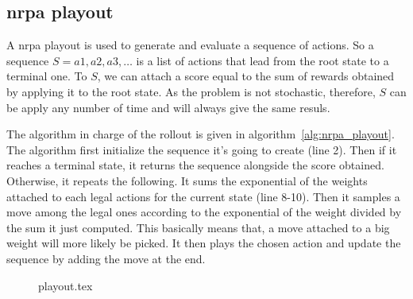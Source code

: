 \subsection{\acrshort{nrpa} playout}%
\label{sub:nrpa_playout}

A \gls{nrpa} playout is used to generate and evaluate a sequence of actions.
So a sequence \(S={a1, a2, a3, \dots}\) is a list of actions that lead from the root state to a terminal one.
To \(S\), we can attach a score equal to the sum of rewards obtained by applying it to the root state.
As the problem is not stochastic, therefore, \(S\) can be apply any number of time and will always give the same resuls.

The algorithm in charge of the rollout is given in algorithm~\ref{alg:nrpa_playout}.
The algorithm first initialize the sequence it's going to create (line 2).
Then if it reaches a terminal state, it returns the sequence alongside the score obtained.
Otherwise, it repeats the following.
It sums the exponential of the weights attached to each legal actions for the current state (line 8-10).
Then it samples a move among the legal ones according to the exponential of the weight divided by the sum it just computed.
This basically means that, a move attached to a big weight will more likely be picked.
It then plays the chosen action and update the sequence by adding the move at the end.

\begin{figure}[htpb]
    \centering
    \begin{minipage}{.7\linewidth}
        {playout.tex}
    \end{minipage}
\end{figure}




